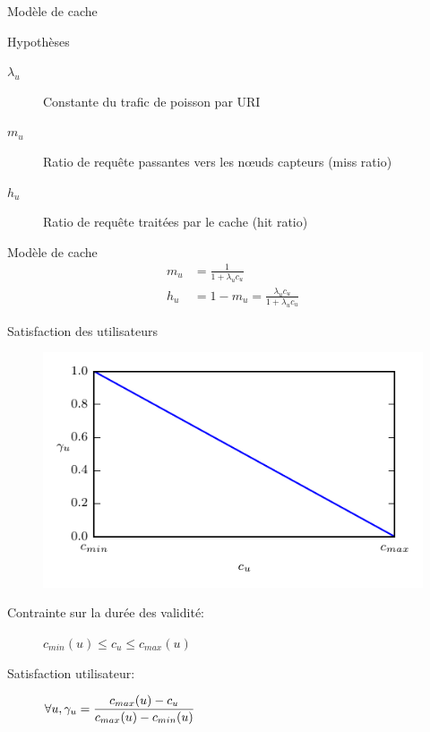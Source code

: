 \begin{frame}{Modèle de cache}
  \begin{block}{Hypothèses}
    \begin{description}
      \item[$\lambda_u$] Constante du trafic de poisson par URI
      \item[$m_u$] Ratio de requête passantes vers les nœuds capteurs (miss ratio)
      \item[$h_u$] Ratio de requête traitées par le cache (hit ratio)
    \end{description}
  \end{block}
  \begin{alertblock}{Modèle de cache}
    \begin{align}
      m_u &= \frac{1}{1 + \lambda_u c_u}
      \label{cache:eq:cache_miss}\\
      h_u &= 1 - m_u = \frac{\lambda_u c_u}{1 + \lambda_u c_u}
      \label{cache:eq:cache_hit}
    \end{align}
  \end{alertblock}
\end{frame}

\begin{frame}{Satisfaction des utilisateurs}

  \begin{figure}
    \centering
    \includegraphics[width=.7\textwidth]{figures/satisfaction_utilisateur.pdf}
  \end{figure}

  \begin{description}
    \item[Contrainte sur la durée des validité:] $c_{min}(u) \leq c_u \leq c_{max}(u)$
    \item[Satisfaction utilisateur:] $\forall u, \gamma_u = \dfrac{c_{max}(u) - c_u}{c_{max}(u) - c_{min}(u)}$
  \end{description}

\end{frame}

